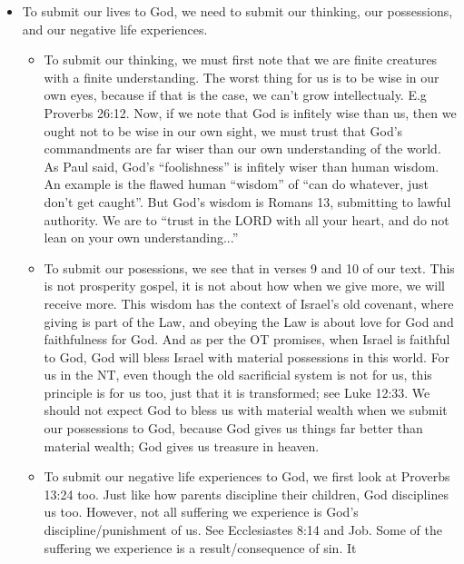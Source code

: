 \begin{itemize}
{\begin{itemize}
{    might lead to us sacrificing something on our end.  However, living the
    good life is not about maximising our self pleasure, but it is about the
    collective shalom of all, which is God's original plan for humanity
    anyway.}
    \item{To submit our lives to God, we need to submit our thinking, our
    possessions, and our negative life experiences.
    \begin{itemize}
      \item{To submit our thinking, we must first note that we are finite
      creatures with a finite understanding.  The worst thing for us is to be
      wise in our own eyes, because if that is the case, we can't grow
      intellectualy.  E.g Proverbs 26:12.  Now, if we note that God is
      infitely wise than us, then we ought not to be wise in our own sight,
      we must trust that God's commandments are far wiser than our own
      understanding of the world.  As Paul said, God's ``foolishness'' is
      infitely wiser than human wisdom.  An example is the flawed human
      ``wisdom'' of ``can do whatever, just don't get caught''.  But God's
      wisdom is Romans 13, submitting to lawful authority.  We are to ``trust
      in the LORD with all your heart, and do not lean on your own
      understanding...''}
      \item{To submit our posessions, we see that in verses 9 and 10 of our
      text.  This is not prosperity gospel, it is not about how when we give
      more, we will receive more.  This wisdom has the context of Israel's
      old covenant, where giving is part of the Law, and obeying the Law is
      about love for God and faithfulness for God.  And as per the OT
      promises, when Israel is faithful to God, God will bless Israel with
      material possessions in this world.  For us in the NT, even though the old
      sacrificial system is not for us, this principle is for us too, just
      that it is transformed; see Luke 12:33.  We should not expect God to
      bless us with material wealth when we submit our possessions to God, because God gives us things far better than material wealth; God gives us treasure in heaven.}
      \item{To submit our negative life experiences to God, we first look at
      Proverbs 13:24 too.  Just like how parents discipline their children,
      God disciplines us too.  However, not all suffering we experience is
      God's discipline/punishment of us.  See Ecclesiastes 8:14 and Job.
      Some of the suffering we experience is a result/consequence of sin.  It
}
\end{itemize}}
\end{itemize}}
\end{itemize}
